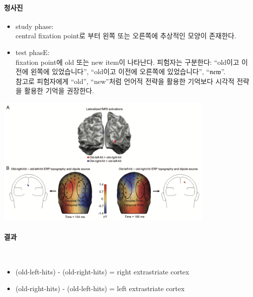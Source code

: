 \documentclass[../note.tex]{subfiles}
\begin{document}
{  \paragraph{청사진}
  \begin{itemize}
    \item study phase:\\
      central fixation point로 부터 왼쪽 또는 오른쪽에 추상적인 모양이 존재한다.
    \item test phasE:\\
      fixation point에 old 또는 new item이 나타난다. 피험자는 구분한다:
      ``old이고 이전에 왼쪽에 있었습니다'', ``old이고 이전에 오른쪽에 있었습니다'', ``$\mathfrak{new}$''.\\
      참고로 피험자에게 ``old'', ``new''처럼 언어적 전략을 활용한 기억보다 시각적 전략을 활용한 기억을 권장한다.
  \end{itemize}
  \begin{center}
    \includegraphics[width=0.8\textwidth]{image/ch8_result1}
    \label{fig:ch8_result1}
  \end{center}

  \paragraph{결과}\\
  \begin{itemize}
    \item (old-left-hits) - (old-right-hits) = right extrastriate cortex
    \item (old-right-hits) - (old-left-hits) = left extrastriate cortex
  \end{itemize}

}
\end{document}
